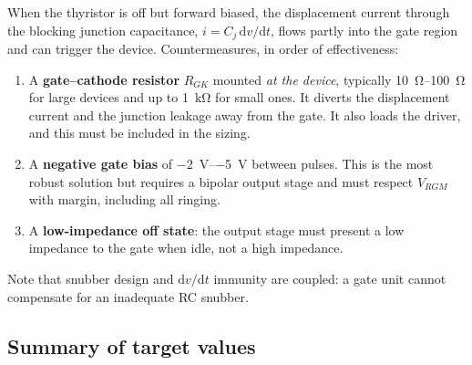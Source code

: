 When the thyristor is off but forward biased, the displacement current through the
blocking junction capacitance, $i = C_j\,\mathrm{d}v/\mathrm{d}t$, flows partly
into the gate region and can trigger the device. Countermeasures, in order of
effectiveness:

\begin{enumerate}
  \item A \textbf{gate--cathode resistor} $R_{GK}$ mounted \emph{at the device},
        typically \SIrange{10}{100}{\ohm} for large devices and up to
        \SI{1}{\kilo\ohm} for small ones. It diverts the displacement current and
        the junction leakage away from the gate. It also loads the driver, and this
        must be included in the sizing.
  \item A \textbf{negative gate bias} of \SIrange{-2}{-5}{\volt} between pulses.
        This is the most robust solution but requires a bipolar output stage and
        must respect $V_{RGM}$ with margin, including all ringing.
  \item A \textbf{low-impedance off state}: the output stage must present a low
        impedance to the gate when idle, not a high impedance.
\end{enumerate}

Note that snubber design and $\mathrm{d}v/\mathrm{d}t$ immunity are coupled: a
gate unit cannot compensate for an inadequate RC snubber.

\subsection{Summary of target values}

